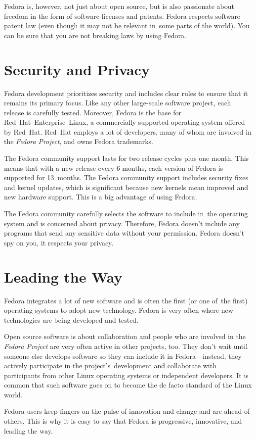 Fedora is, however, not just about open source, but is also passionate about freedom in the form of software licenses and patents. Fedora respects software patent law (even though it may not be relevant in~some parts of the world). You can be sure that you are not breaking laws by using Fedora.

\section*{Security and Privacy}

Fedora development prioritizes security and includes clear rules to ensure that it remains its primary focus. Like any other large-scale software project, each release is carefully tested. Moreover, Fedora is the base for Red~Hat~Enterprise~Linux, a commercially supported operating system offered by Red~Hat. Red~Hat employs a lot of developers, many of whom are involved in the \emph{Fedora Project}, and owns Fedora trademarks.

The Fedora community support lasts for two release cycles plus one month. This means that with a new release every 6 months, each version of Fedora is supported for 13~months. The Fedora community support includes security fixes and kernel updates, which is significant because new kernels mean improved and new hardware support. This is a big advantage of using Fedora.

The Fedora community carefully selects the software to include in~the operating system and is concerned about privacy. Therefore, Fedora doesn't include any programs that send any sensitive data without your permission. Fedora doesn't spy on you, it respects your privacy.

\section*{Leading the Way}

Fedora integrates a lot of new software and is often the first (or one of~the first) operating systems to adopt new technology. Fedora is very often where new technologies are being developed and tested.

Open source software is about collaboration and people who are involved in the \emph{Fedora Project} are very often active in other projects, too. They don't wait until someone else develops software so they can include it in Fedora---instead, they actively participate in the project's~development and collaborate with participants from other Linux operating systems or independent developers. It is common that such software goes on to become the de facto standard of the Linux world.

Fedora users keep fingers on the pulse of innovation and change and are ahead of others. This is why it is easy to say that Fedora is progressive, innovative, and leading the way.
\endinput
